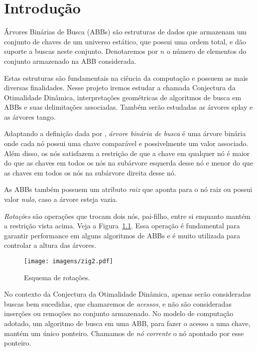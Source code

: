 
\chapter{Introdução}
\label{cap:introducao}

Árvores Binárias de Busca (ABBs) são estruturas de dados que armazenam um conjunto de chaves de um universo estático, que possui uma ordem total, e dão suporte a buscas neste conjunto. Denotaremos por $n$ o número de elementos do conjunto armazenado na ABB considerada.

Estas estruturas são fundamentais na ciência da computação e possuem as mais diversas finalidades. Nesse projeto iremos estudar a chamada Conjectura da Otimalidade Dinâmica, interpretações geométricas de algoritmos de busca em ABBs e suas delimitações associadas. Também serão estudadas as árvores splay e as árvores tango.

Adaptando a definição dada por \cite{Sedgewick}, \textit{árvore binária de busca} é uma árvore binária onde cada nó possui uma chave comparável e possivelmente um valor associado. Além disso, os nós satisfazem a restrição de que a chave em qualquer nó é maior do que as chaves em todos os nós na subárvore esquerda desse nó e menor do que as chaves em todos os nós na subárvore direita desse nó.

As ABBs também possuem um atributo \textit{raiz} que aponta para o nó raiz ou possui valor \textit{nulo}, caso a árvore esteja vazia.

\textit{Rotações} são operações que trocam dois nós, pai-filho, entre si enquanto mantém a restrição vista acima. Veja a Figura~\ref{fig:imagem}. Essa operação é fundamental para garantir performance em alguns algoritmos de ABBs e é muito utilizada para controlar a altura das árvores.


\begin{figure}[h]
    \centering
    \texttt{[image: imagens/zig2.pdf]}
    \caption{Esquema de rotações.}
    \label{fig:imagem}
\end{figure}

No contexto da Conjectura da Otimalidade Dinâmica, apenas serão consideradas buscas bem sucedidas, que chamaremos de \textit{acessos}, e não são consideradas inserções ou remoções no conjunto armazenado. No modelo de computação adotado, um algoritmo de busca em uma ABB, para fazer o acesso a uma chave, mantém um único ponteiro. Chamamos de \textit{nó corrente} o nó apontado por esse ponteiro. 

